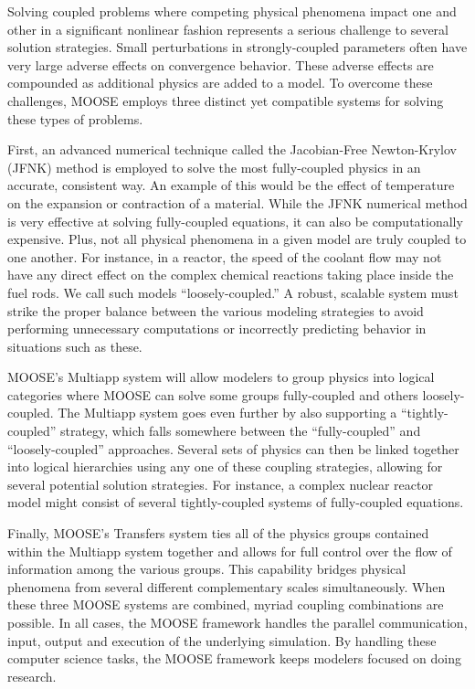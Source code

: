 \documentclass{INLreport}
\begin{document}
Solving coupled problems where competing physical phenomena impact one and other in a significant nonlinear fashion represents a
serious challenge to
several solution strategies. Small perturbations in strongly-coupled parameters often have very large adverse effects on
convergence behavior. These adverse effects are compounded as additional physics are added to a model. To overcome these
challenges, MOOSE employs three distinct yet compatible systems for solving these types of problems.

First, an advanced numerical technique called the Jacobian-Free Newton-Krylov (JFNK) method is employed to solve the most fully-coupled physics
in an accurate, consistent way. An example of this would be the effect of temperature on the expansion or contraction of a
material. While the JFNK numerical method is very effective at solving fully-coupled equations, it can also be computationally
expensive. Plus, not all physical phenomena in a given model are truly coupled to one another. For instance, in a reactor, the
speed of the coolant flow may not have any direct effect on the complex chemical reactions taking place inside the fuel rods.
We call such models “loosely-coupled.” A robust, scalable system must strike the proper balance between the various modeling
strategies to avoid performing unnecessary computations or incorrectly predicting behavior in situations such as these.

MOOSE’s Multiapp system will allow modelers to group physics into logical categories where MOOSE can solve some groups
fully-coupled and others loosely-coupled. The Multiapp system goes even further by also supporting a “tightly-coupled”
strategy, which falls somewhere between the “fully-coupled” and “loosely-coupled” approaches. Several sets of physics can then
be linked together into logical hierarchies using any one of these coupling strategies, allowing for several potential solution
strategies. For instance, a complex nuclear reactor model might consist of several tightly-coupled systems of fully-coupled
equations.

Finally, MOOSE’s Transfers system ties all of the physics groups contained within the Multiapp system together and allows for
full control over the flow of information among the various groups. This capability bridges physical phenomena from several
different complementary scales simultaneously. When these three MOOSE systems are combined, myriad coupling combinations are
possible. In all cases, the MOOSE framework handles the parallel communication, input, output and execution of the underlying
simulation. By handling these computer science tasks, the MOOSE framework keeps modelers focused on doing research.
\end{document}
